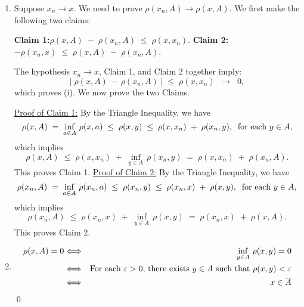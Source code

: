 \begin{enumerate}
\item
	Suppose $x_{n} \longrightarrow x$. We need to prove $\rho(x_{n},A) \longrightarrow \rho(x,A)$.
	We first make the following two claims:

	\vskip 0.5cm
	\begin{center}
	\begin{minipage}{6.0in}
	\noindent
	\textbf{Claim 1:}\quad$\rho(x,A) \;-\; \rho(x_{n},A) \;\leq\; \rho(x,x_{n})$.
	\vskip 0.2cm
	\textbf{Claim 2:}\quad$- \rho(x_{n},x) \;\leq\; \rho(x,A) \;-\; \rho(x_{n},A)$.
	\end{minipage}
	\end{center}

	\vskip 0.1cm
	\noindent
	The hypothesis $x_{n} \longrightarrow x$, Claim 1, and Claim 2 together imply:
	\begin{equation*}
	\left\vert\;\rho(x,A) \,-\, \rho(x_{n},A)\;\right\vert \; \leq \; \rho(x,x_{n})
	\;\;\longrightarrow\;\;0,
	\end{equation*}
	which proves (i). We now prove the two Claims.

	\vskip 0.2cm
	\noindent
	\underline{Proof of Claim 1:}\quad
	By the Triangle Inequality, we have
	\begin{equation*}
	\rho(x,A) \;=\; \inf_{a \in A}\,\rho(x,a) \;\leq\; \rho(x,y) \;\leq\; \rho(x,x_{n}) \;+\; \rho(x_{n},y),
	\;\;\textnormal{for each $y \in A$},
	\end{equation*}
	which implies
	\begin{equation*}
	\rho(x,A) \;\leq\; \rho(x,x_{n}) \;+\; \inf_{y \in A}\,\rho(x_{n},y) \;=\; \rho(x,x_{n}) \;+\; \rho(x_{n},A).
	\end{equation*}
	This proves Claim 1.
	\vskip 0.5cm
	\noindent
	\underline{Proof of Claim 2:}\quad
	By the Triangle Inequality, we have
	\begin{equation*}
	\rho(x_{n},A) \;=\; \inf_{a \in A}\,\rho(x_{n},a) \;\leq\; \rho(x_{n},y) \;\leq\; \rho(x_{n},x) \;+\; \rho(x,y),
	\;\;\textnormal{for each $y \in A$},
	\end{equation*}
	which implies
	\begin{equation*}
	\rho(x_{n},A) \;\leq\; \rho(x_{n},x) \;+\; \inf_{y \in A}\,\rho(x,y) \;=\; \rho(x_{n},x) \;+\; \rho(x,A).
	\end{equation*}
	This proves Claim 2.

\item
	\begin{eqnarray*}
	\rho(x,A) = 0
	&\Longleftrightarrow& \inf_{y\in A}\,\rho(x,y) = 0
	\\
	&\Longleftrightarrow& \textnormal{For each $\varepsilon > 0$, there exists $y \in A$ such that $\rho(x,y) < \varepsilon$}
	\\
	&\Longleftrightarrow& x \in \overline{A}
	\end{eqnarray*}
\qed
\end{enumerate}

